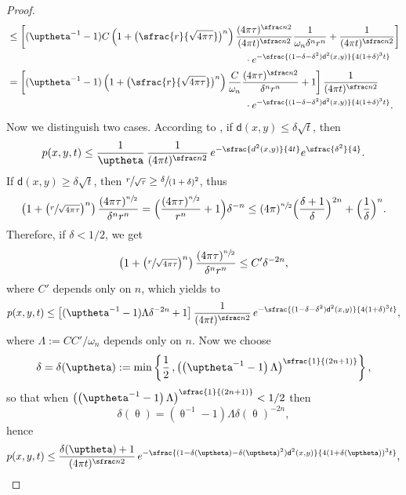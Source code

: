 \documentclass[10pt]{amsart}
\newcommand{\spfrac}[2]{\sfrac{#1}{(#2)}}
\theoremstyle{plain}
\theoremstyle{definition}
\newcommand{\dist}{\mathsf{d}}
\begin{document}
\begin{proof}
\begin{align*}
& \le\left[(\uptheta^{-1}-1) C\left(1+\bigl(\sfrac{r}{\sqrt{4\pi\tau}} \bigr)^n\right)\frac{(4\pi \tau)^{\sfrac n2}}{(4\pi t)^{\sfrac n2}}\frac{1}{\omega_n \delta^n r^n}+\frac{1}{(4\pi t)^{\sfrac n2}}\right]\\
&\hspace*{8.5cm}\cdot e^{-\sfrac{(1-\delta-\delta^2)\dist^2(x,y)}{4(1+\delta)^3t}}\\
& = \left[(\uptheta^{-1}-1)\left(1+\bigl(\sfrac{r}{\sqrt{4\pi\tau}} \bigr)^n\right) \frac{C}{\omega_n}\frac{(4\pi \tau)^{\sfrac n2}}{\delta^n r^n} +1\right]\frac{1}{(4\pi t)^{\sfrac n2}}\\
&\hspace*{8.5cm}\cdot e^{-\sfrac{(1-\delta-\delta^2)\dist^2(x,y)}{4(1+\delta)^3t}}.
\end{align*}
Now we distinguish two cases. According to \cite[Form.\,(2.4)]{LiTamWang}, if $\dist(x,y)\le \delta \sqrt{t}$, then
\begin{equation}\label{esti1}p(x,y,t)\le \frac{1}{\uptheta}\, \frac{1}{(4\pi t)^{\sfrac n2}}\, e^{-\sfrac{d^2(x,y)}{4t}} e^{\sfrac{\delta^2}{4}}.\end{equation}
If $\dist(x,y)\ge \delta \sqrt{t}$, then $\sfrac{r}{\sqrt{\tau}}\ge \sfrac{\delta}{(1+\delta)^{2}}$, thus
\[
\left(1+\bigl(\sfrac{r}{\sqrt{4\pi\tau}}\bigr)^n\right) \frac{(4\pi \tau)^{\sfrac n2}}{\delta^n r^n} = \Bigl(\frac{(4\pi \tau)^{\sfrac n2}}{r^n} + 1 \Bigr)\delta^{-n} \le (4\pi)^{\sfrac n2}\Bigl(\frac{\delta+ 1}{\delta}\Bigr)^{2n}+\Bigl(\frac{1}{\delta}\Bigr)^n.
\]
Therefore, if $\delta<1/2$, we get
\[
\left(1+\bigl(\sfrac{r}{\sqrt{4\pi\tau}}\bigr)^n\right) \frac{(4\pi \tau)^{\sfrac n2}}{\delta^n r^n} \le C'\delta^{-2n},
\]
where $C'$ depends only on $n$, which yields to
\[
p(x,y,t) \le \left[(\uptheta^{-1}-1)\Lambda \delta^{-2n}+1\right]\frac{1}{(4\pi t)^{\sfrac n2}}\,e^{-\sfrac{(1-\delta-\delta^2)\dist^2(x,y)}{4(1+\delta)^3t}},
\]
where $\Lambda:=CC'/\omega_n$ depends only on $n$. Now we choose \begin{equation}\label{eq:delta}
\delta=\delta(\uptheta):=\min\left\{ \frac 12\,, \left(\left(\uptheta^{-1}-1\right)\Lambda\right)^{\spfrac{1}{2n+1}}\right\},\end{equation}
so that when $\left(\left(\uptheta^{-1}-1\right)\Lambda\right)^{\spfrac{1}{2n+1}} < 1/2$ then
\[
\delta(\uptheta)= \left(\uptheta^{-1}-1\right)\Lambda\delta(\uptheta)^{-2n},
\]
hence
\begin{equation}\label{eq:end}
p(x,y,t)\le \frac{\delta(\uptheta)+1}{(4\pi t)^{\sfrac n2}}\,e^{-\sfrac{(1-\delta(\uptheta)-\delta(\uptheta)^2)\dist^2(x,y)}{4(1+\delta(\uptheta))^3t}},

\end{equation}
\end{proof}
\end{document}
